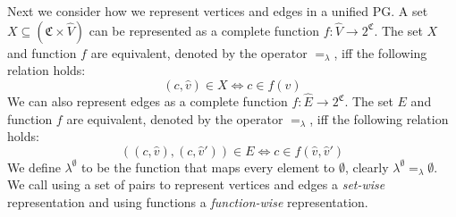 Next we consider how we represent vertices and edges in a unified PG. A set $X \subseteq (\mathfrak{C} \times \hat{V})$ can be represented as a complete function $f : \hat{V} \rightarrow 2^\mathfrak{C}$. The set $X$ and function $f$ are equivalent, denoted by the operator $=_\lambda$, iff the following relation holds:
\[ (c,\hat{v}) \in X \iff c \in f(\hat{v}) \]
We can also represent edges as a complete function $f : \hat{E} \rightarrow 2^\mathfrak{C}$. The set $E$ and function $f$ are equivalent, denoted by the operator $=_\lambda$, iff the following relation holds:
\[ ((c,\hat{v}),(c,\hat{v}')) \in E \iff c \in f(\hat{v},\hat{v}') \]
We define $\lambda^\emptyset$ to be the function that maps every element to $\emptyset$, clearly $\lambda^\emptyset =_\lambda \emptyset$. We call using a set of pairs to represent vertices and edges a \textit{set-wise} representation and using functions a \textit{function-wise} representation.

